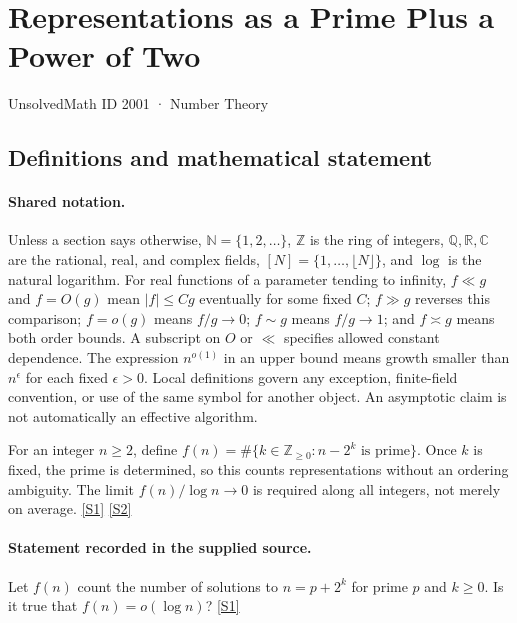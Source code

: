 \documentclass[11pt,a4paper]{article}
\newcommand{\N}{\mathbb{N}}
\newcommand{\Z}{\mathbb{Z}}
\newcommand{\Q}{\mathbb{Q}}
\newcommand{\R}{\mathbb{R}}
\newcommand{\C}{\mathbb{C}}
\newcommand{\sref}[2]{\hyperlink{source:#1:#2}{[S#2]}}
\begin{document}

\setcounter{section}{2000}

\section{Representations as a Prime Plus a Power of Two}\label{2001}

{\small\sffamily UnsolvedMath ID 2001 · Number Theory}

\subsection{Definitions and mathematical statement}

\paragraph{Shared notation.}Unless a section says otherwise, $\N=\{1,2,\ldots\}$,
$\Z$ is the ring of integers, $\Q,\R,\C$ are the rational, real, and complex
fields, $[N]=\{1,\ldots,\lfloor N\rfloor\}$, and $\log$ is the natural
logarithm. For real functions of a parameter tending to infinity,
$f\ll g$ and $f=O(g)$ mean $|f|\leq Cg$ eventually for some fixed $C$;
$f\gg g$ reverses this comparison; $f=o(g)$ means $f/g\to0$;
$f\sim g$ means $f/g\to1$; and $f\asymp g$ means both order bounds.
A subscript on $O$ or $\ll$ specifies allowed constant dependence.
The expression $n^{o(1)}$ in an upper bound means growth smaller than
$n^\epsilon$ for each fixed $\epsilon>0$. Local definitions govern any
exception, finite-field convention, or use of the same symbol for another
object. An asymptotic claim is not automatically an effective algorithm.



For an integer $n\geq2$, define $f(n)=\#\{k\in\Z_{\geq0}:n-2^k\text{ is prime}\}$. Once $k$ is fixed, the prime is determined, so this counts representations without an ordering ambiguity. The limit $f(n)/\log n\to0$ is required along all integers, not merely on average. \sref{2001}{1} \sref{2001}{2}

\paragraph{Statement recorded in the supplied source.}
Let $f(n)$ count the number of solutions to $n=p+2^k$ for prime $p$ and $k\geq 0$. Is it true that $f(n)=o(\log n)$? \sref{2001}{1}
\end{document}
